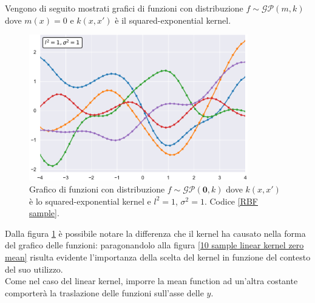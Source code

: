 Vengono di seguito mostrati grafici di funzioni con distribuzione $f\sim \mathcal{GP}(m,k)$ dove $m(x)=0$ e $k(x,x')$ è il squared-exponential kernel.


\begin{figure}[h]
    \centering
    \includegraphics[width=0.85\textwidth]{images/Gaussian process/RBFSample.pdf}
    \caption{Grafico di funzioni con distribuzione $f\sim \mathcal{GP}(\bm{0},k)$ dove $k(x,x')$ è lo squared-exponential kernel e $l^2=1$, $\sigma^2=1$. Codice \ref{RBF sample}.}
    \label{10 sample exponential kerne zero mean}
\end{figure}

Dalla figura \ref{10 sample exponential kerne zero mean} è possibile notare la differenza che il kernel ha causato nella forma del grafico delle funzioni: paragonandolo alla figura \ref{10 sample linear kernel zero mean} risulta evidente l'importanza della scelta del kernel in funzione del contesto del suo utilizzo.\\
Come nel caso del linear kernel, imporre la mean function ad un'altra costante comporterà la traslazione delle funzioni sull'asse delle $y$.


\newpage 



